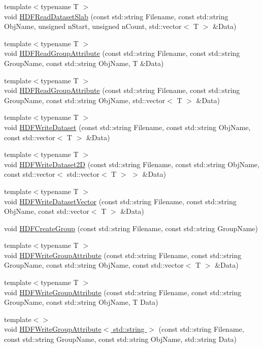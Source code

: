 \begin{DoxyCompactItemize}
\item 
{\footnotesize template$<$typename T $>$ }\\void \hyperlink{HDFIO_8h_ac10c67494671661d5466ff2258154c8a}{HDFReadDatasetSlab} (const std::string Filename, const std::string ObjName, unsigned nStart, unsigned nCount, std::vector$<$ T $>$ \&Data)
\item 
{\footnotesize template$<$typename T $>$ }\\void \hyperlink{HDFIO_8h_ab2ce05626da8d9a7d059795c4d5f02cc}{HDFReadGroupAttribute} (const std::string Filename, const std::string GroupName, const std::string ObjName, T \&Data)
\item 
{\footnotesize template$<$typename T $>$ }\\void \hyperlink{HDFIO_8h_aa73c5851b1f8ae24364803f9578b1d8f}{HDFReadGroupAttribute} (const std::string Filename, const std::string GroupName, const std::string ObjName, std::vector$<$ T $>$ \&Data)
\item 
{\footnotesize template$<$typename T $>$ }\\void \hyperlink{HDFIO_8h_aa73a8d13c03b62b0a709d7e7248f0ca7}{HDFWriteDataset} (const std::string Filename, const std::string ObjName, const std::vector$<$ T $>$ \&Data)
\item 
{\footnotesize template$<$typename T $>$ }\\void \hyperlink{HDFIO_8h_a913817631ba066e8204abbacb6eb6b9f}{HDFWriteDataset2D} (const std::string Filename, const std::string ObjName, const std::vector$<$ std::vector$<$ T $>$ $>$ \&Data)
\item 
{\footnotesize template$<$typename T $>$ }\\void \hyperlink{HDFIO_8h_a2beb19611043d3393a282ae7a2810075}{HDFWriteDatasetVector} (const std::string Filename, const std::string ObjName, const std::vector$<$ T $>$ \&Data)
\item 
void \hyperlink{HDFIO_8h_adfafd5685316cd050ad282b7837e7f05}{HDFCreateGroup} (const std::string Filename, const std::string GroupName)
\item 
{\footnotesize template$<$typename T $>$ }\\void \hyperlink{HDFIO_8h_a93cc34de059a978c3b65e4a2fdd8bbc8}{HDFWriteGroupAttribute} (const std::string Filename, const std::string GroupName, const std::string ObjName, const std::vector$<$ T $>$ \&Data)
\item 
{\footnotesize template$<$typename T $>$ }\\void \hyperlink{HDFIO_8h_a63d06b2c68f083f2a15b63f95b228a9b}{HDFWriteGroupAttribute} (const std::string Filename, const std::string GroupName, const std::string ObjName, T Data)
\item 
{\footnotesize template$<$$>$ }\\void \hyperlink{HDFIO_8h_a1e82999f4bd8497304ff6571d9566781}{HDFWriteGroupAttribute$<$ std::string $>$} (const std::string Filename, const std::string GroupName, const std::string ObjName, std::string Data)
\end{DoxyCompactItemize}


